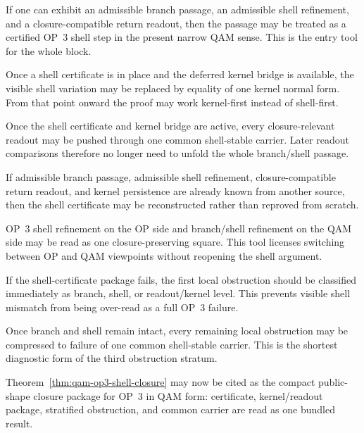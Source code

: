 \begin{description}[leftmargin=2.2em,style=nextline]
  \item[Shell-certificate tool.]\label{tool:qam-shell-certificate}
  If one can exhibit an admissible branch passage, an admissible shell refinement, and a closure-compatible return readout, then the passage may be treated as a certified OP~3 shell step in the present narrow QAM sense. This is the entry tool for the whole block.

  \item[Kernel-persistence tool.]\label{tool:qam-kernel-persistence}
  Once a shell certificate is in place and the deferred kernel bridge is available, the visible shell variation may be replaced by equality of one kernel normal form. From that point onward the proof may work kernel-first instead of shell-first.

  \item[Shell-stable readout tool.]\label{tool:qam-shell-stable-readout}
  Once the shell certificate and kernel bridge are active, every closure-relevant readout may be pushed through one common shell-stable carrier. Later readout comparisons therefore no longer need to unfold the whole branch/shell passage.

  \item[Converse reconstruction tool.]\label{tool:qam-shell-converse}
  If admissible branch passage, admissible shell refinement, closure-compatible return readout, and kernel persistence are already known from another source, then the shell certificate may be reconstructed rather than reproved from scratch.

  \item[Commuting-square tool.]\label{tool:qam-shell-commuting-square}
  OP~3 shell refinement on the OP side and branch/shell refinement on the QAM side may be read as one closure-preserving square. This tool licenses switching between OP and QAM viewpoints without reopening the shell argument.

  \item[Obstruction-stratification tool.]\label{tool:qam-shell-obstruction-stratification}
  If the shell-certificate package fails, the first local obstruction should be classified immediately as branch, shell, or readout/kernel level. This prevents visible shell mismatch from being over-read as a full OP~3 failure.

  \item[Carrier-compression tool.]\label{tool:qam-shell-carrier-compression}
  Once branch and shell remain intact, every remaining local obstruction may be compressed to failure of one common shell-stable carrier. This is the shortest diagnostic form of the third obstruction stratum.

  \item[Bundled OP~3 closure tool.]\label{tool:qam-op3-shell-closure}
  Theorem~\ref{thm:qam-op3-shell-closure} may now be cited as the compact public-shape closure package for OP~3 in QAM form: certificate, kernel/readout package, stratified obstruction, and common carrier are read as one bundled result.
\end{description}

